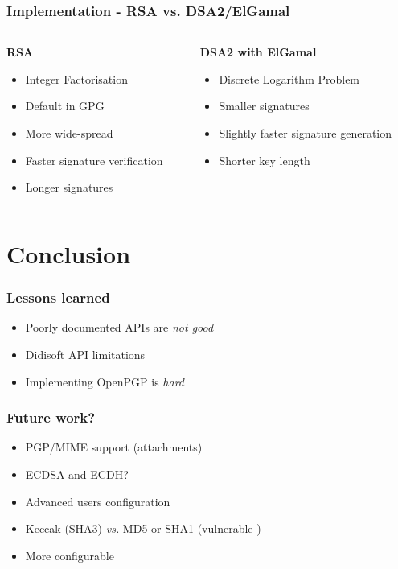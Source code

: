 \documentclass{beamer}
\begin{document}
\begin{frame}
\frametitle{Implementation - RSA vs. DSA2/ElGamal}
\begin{columns}[onlytextwidth]
\begin{column}{0.45\textwidth} %
\centering
\textbf{RSA}
\begin{itemize}
\item Integer Factorisation
\item Default in GPG \cite{wk}
\item More wide-spread
\item Faster signature verification
\item Longer signatures
\end{itemize}
\end{column}

\begin{column}{0.45\textwidth} %
\centering
\textbf{DSA2 with ElGamal}
\begin{itemize}
\item Discrete Logarithm Problem
\item Smaller signatures
\item Slightly faster signature generation
\item Shorter key length
\end{itemize}
\end{column}
\end{columns}
\end{frame}

\section{Conclusion}
\begin{frame}
\frametitle{Lessons learned}
\begin{itemize}
\item Poorly documented APIs are \emph{not good}
\item Didisoft API limitations \cite{dd}
\item Implementing OpenPGP is \emph{hard}
\end{itemize}
\end{frame}


\begin{frame}[fragile] %
\frametitle{Future work?}
\begin{itemize}
\item PGP/MIME support (attachments)
\item ECDSA and ECDH?
\item Advanced users configuration
\item Keccak (SHA3) \emph{vs.} MD5 or SHA1 (vulnerable \cite{sh})
\item More configurable
\end{itemize}
\end{frame}
\end{document}
